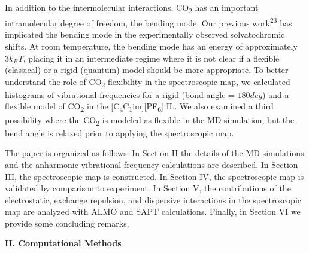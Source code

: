 \documentclass[]{article}
\begin{document}
In addition to the intermolecular interactions, CO\textsubscript{2} has
an important intramolecular degree of freedom, the bending mode. Our
previous work\textsuperscript{23} has implicated the bending mode in the
experimentally observed solvatochromic shifts. At room temperature, the
bending mode has an energy of approximately \(3k_{B}T\), placing it in
an intermediate regime where it is not clear if a flexible (classical)
or a rigid (quantum) model should be more appropriate. To better
understand the role of CO\textsubscript{2} flexibility in the
spectroscopic map, we calculated histograms of vibrational frequencies
for a rigid (bond angle = \(180deg\)) and a flexible model of
CO\textsubscript{2} in the
{[}C\textsubscript{4}C\textsubscript{1}im{]}{[}PF\textsubscript{6}{]}
IL. We also examined a third possibility where the CO\textsubscript{2}
is modeled as flexible in the MD simulation, but the bend angle is
relaxed prior to applying the spectroscopic map.

The paper is organized as follows. In Section II the details of the MD
simulations and the anharmonic vibrational frequency calculations are
described. In Section III, the spectroscopic map is constructed. In
Section IV, the spectroscopic map is validated by comparison to
experiment. In Section V, the contributions of the electrostatic,
exchange repulsion, and dispersive interactions in the spectroscopic map
are analyzed with ALMO and SAPT calculations. Finally, in Section VI we
provide some concluding remarks.

\textbf{II. Computational Methods}
\end{document}
